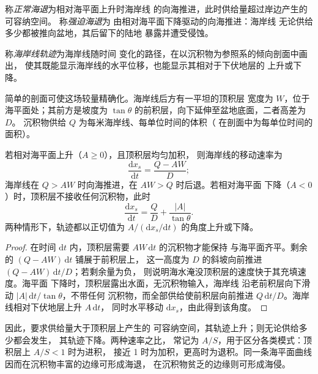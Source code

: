 \begin{definition}[正常海退与强迫海退]\label{def:b3:sequence-stratigraphy:regression}
称\emph{正常海退}为相对海平面上升时海岸线
的向海推进，此时供给量超过岸边产生的可容纳空间。
称\emph{强迫海退}为
由相对海平面下降驱动的向海推进：海岸线
无论供给多少都被推向盆地，其后留下的陆地
暴露并遭受侵蚀。
\end{definition}

\begin{definition}[海岸线轨迹]\label{def:b3:sequence-stratigraphy:trajectory}
称\emph{海岸线轨迹}为海岸线随时间
变化的路径，在以沉积物为参照系的倾向剖面中画出，
使其既能显示海岸线的水平位移，也能显示其相对于下伏地层的
上升或下降。
\end{definition}

简单的剖面可使这场较量精确化。海岸线后方有一平坦的顶积层
宽度为 $W$，位于海平面处；其前方是坡度为
$\tan\theta$ 的前积层，向下延伸至盆地底面，二者高差为 $D$。
沉积物供给 $Q$ 为每米海岸线、每单位时间的体积（
在剖面中为每单位时间的面积）。

\begin{proposition}[海岸线轨迹]\label{prop:b3:sequence-stratigraphy:trajectory}
若相对海平面上升（$A \ge 0$），且顶积层均匀加积，
则海岸线的移动速率为
\[
\frac{\mathrm dx_s}{\mathrm dt} = \frac{Q - AW}{D};
\]
海岸线在 $Q > AW$ 时向海推进，在 $AW > Q$ 时后退。若相对海平面
下降（$A < 0$）时，顶积层不接收任何沉积物，此时
\[
\frac{\mathrm dx_s}{\mathrm dt} = \frac{Q}{D} + \frac{|A|}{\tan\theta}.
\]
两种情形下，轨迹都以正切值为
$A/(\mathrm dx_s/\mathrm dt)$ 的角度上升或下降。
\end{proposition}

\begin{proof}
在时间 $\mathrm dt$ 内，顶积层需要 $AW\,\mathrm dt$ 的沉积物才能保持
与海平面齐平。剩余的 $(Q - AW)\,\mathrm dt$ 铺展于前积层上，
这一高度为 $D$ 的斜坡向前推进 $(Q - AW)\,\mathrm dt/D$；若剩余量为负，
则说明海水淹没顶积层的速度快于其充填速度。海平面
下降时，顶积层露出水面，无沉积物输入，海岸线
沿老前积层向下滑动 $|A|\,\mathrm dt/\tan\theta$，不带任何
沉积物，而全部供给使前积层向前推进 $Q\,\mathrm
dt/D$。海岸线相对下伏地层上升 $A\,\mathrm dt$，
同时水平移动 $\mathrm dx_s$，由此得到该角度。
\end{proof}

因此，要求供给量大于顶积层上产生的
可容纳空间，其轨迹上升；则无论供给多少都会发生，
其轨迹下降。两种速率之比，
常记为 $A/S$，用于区分各类模式：顶积层上 $A/S < 1$ 时为进积，
接近 1 时为加积，更高时为退积。同一条海平面曲线
因而在沉积物丰富的边缘可形成海退，
在沉积物贫乏的边缘则可形成海侵。

